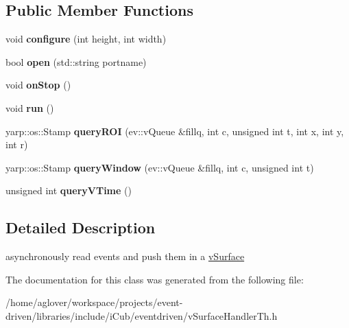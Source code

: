 \subsection*{Public Member Functions}
\begin{DoxyCompactItemize}
\item 
void {\bfseries configure} (int height, int width)\hypertarget{classev_1_1surfaceThread_a17d8e5af5b6617d91631fe3565e7ec21}{}\label{classev_1_1surfaceThread_a17d8e5af5b6617d91631fe3565e7ec21}

\item 
bool {\bfseries open} (std\+::string portname)\hypertarget{classev_1_1surfaceThread_a8fbb7a7f67aeb8766ee1d222550306c9}{}\label{classev_1_1surfaceThread_a8fbb7a7f67aeb8766ee1d222550306c9}

\item 
void {\bfseries on\+Stop} ()\hypertarget{classev_1_1surfaceThread_a65d324c3c3d8f699412f4fa1eb5aff62}{}\label{classev_1_1surfaceThread_a65d324c3c3d8f699412f4fa1eb5aff62}

\item 
void {\bfseries run} ()\hypertarget{classev_1_1surfaceThread_a04b53ae45896e77a84db501ddfc956cf}{}\label{classev_1_1surfaceThread_a04b53ae45896e77a84db501ddfc956cf}

\item 
yarp\+::os\+::\+Stamp {\bfseries query\+R\+OI} (ev\+::v\+Queue \&fillq, int c, unsigned int t, int x, int y, int r)\hypertarget{classev_1_1surfaceThread_a04b8a2e62c4910346bdfc2ae9c82371b}{}\label{classev_1_1surfaceThread_a04b8a2e62c4910346bdfc2ae9c82371b}

\item 
yarp\+::os\+::\+Stamp {\bfseries query\+Window} (ev\+::v\+Queue \&fillq, int c, unsigned int t)\hypertarget{classev_1_1surfaceThread_ad552b309bca76006c5e8adc07fdcbb6a}{}\label{classev_1_1surfaceThread_ad552b309bca76006c5e8adc07fdcbb6a}

\item 
unsigned int {\bfseries query\+V\+Time} ()\hypertarget{classev_1_1surfaceThread_a763bb2d669fdc772316f074fd43c82d8}{}\label{classev_1_1surfaceThread_a763bb2d669fdc772316f074fd43c82d8}

\end{DoxyCompactItemize}


\subsection{Detailed Description}
asynchronously read events and push them in a \hyperlink{classev_1_1vSurface}{v\+Surface} 

The documentation for this class was generated from the following file\+:\begin{DoxyCompactItemize}
\item 
/home/aglover/workspace/projects/event-\/driven/libraries/include/i\+Cub/eventdriven/v\+Surface\+Handler\+Th.\+h\end{DoxyCompactItemize}
